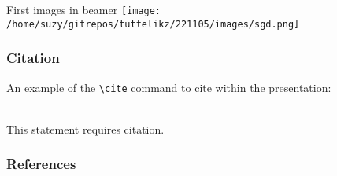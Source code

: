 \documentclass{beamer}
\begin{document}
    \begin{frame}{First images in beamer}
      \centering
          \texttt{[image: /home/suzy/gitrepos/tuttelikz/221105/images/sgd.png]}
    \end{frame}
    

    \begin{frame}[fragile] %
    \frametitle{Citation}
    An example of the \verb|\cite| command to cite within the presentation:\\~
    
    This statement requires citation.~\cite{test1} 
    \end{frame}

    

    \begin{frame}[t, allowframebreaks]
      \frametitle{References}
      
      
    \end{frame}
\end{document}
